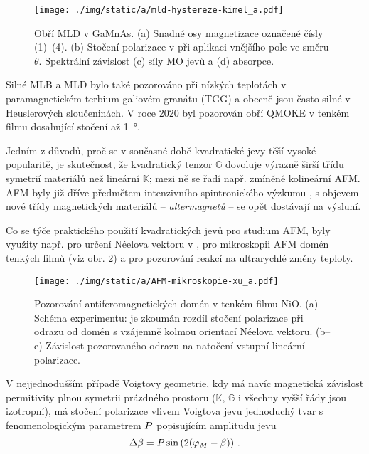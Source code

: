 \begin{figure}[htbp]
    \centering
    \texttt{[image: ./img/static/a/mld-hystereze-kimel\_a.pdf]}
    \caption{Obří MLD v GaMnAs. (a) Snadné osy magnetizace označené čísly (1)--(4). (b) Stočení polarizace v při aplikaci vnějšího pole ve směru $\theta$. Spektrální závislost (c) síly MO jevů a (d) absorpce. \cite{kimelObservationGiantMagnetic2005}}
    \label{fig:obri-MLD}
\end{figure}

Silné MLB a MLD bylo také pozorováno při nízkých teplotách v paramagnetickém terbium-galiovém granátu (TGG)\cite{akbarLowTemperatureVoigt2017} a obecně jsou často silné v Heuslerových sloučeninách\cite{hamrleHugeQuadraticMagnetooptical2007}.
V roce 2020 byl pozorován obří QMOKE v tenkém filmu  dosahující stočení až \SI{1}{\degree}\cite{katsGiantQuadraticMagnetooptical2020}.

Jedním z důvodů, proč se v současné době kvadratické jevy těší vysoké popularitě, je skutečnost, že kvadratický tenzor $\mathbb{G}$ dovoluje výrazně širší třídu symetrií materiálů než lineární $\mathbb{K}$; mezi ně se řadí např. zmíněné kolineární AFM. 
AFM byly již dříve předmětem intenzivního spintronického výzkumu \cite{nemecAntiferromagneticOptospintronics2018,jungwirthAntiferromagneticSpintronics2016}, 
s objevem nové třídy magnetických materiálů -- \emph{altermagnetů}\cite{smejkalAltermagnetismSpinmomentumLocked2021} -- se opět dostávají na výsluní.

Co se týče praktického použití kvadratických jevů pro studium AFM, byly využity např. pro určení Néelova vektoru v \cite{saidlOpticalDeterminationNeel2017}, pro mikroskopii AFM domén\cite{xuImagingAntiferromagneticDomains2019} tenkých filmů  (viz obr. \ref{fig:AFM-mikroskopie-domen}) a pro pozorování reakcí  na ultrarychlé změny teploty\cite{yangMagnetoopticResponseMetallic2019}.

\begin{figure}[htbp]
    \centering
    \texttt{[image: ./img/static/a/AFM-mikroskopie-xu\_a.pdf]}
    \caption{Pozorování antiferomagnetických domén v tenkém filmu NiO. (a) Schéma experimentu: je zkoumán rozdíl stočení polarizace při odrazu od domén s vzájemně kolmou orientací Néelova vektoru. (b--e) Závislost pozorovaného odrazu na natočení vstupní lineární polarizace. \cite{xuImagingAntiferromagneticDomains2019}}
    \label{fig:AFM-mikroskopie-domen}
\end{figure}

V nejjednodušším případě Voigtovy geometrie, kdy má navíc magnetická závislost permitivity plnou symetrii prázdného prostoru ($\mathbb{K}$, $\mathbb{G}$ i všechny vyšší řády jsou izotropní), má stočení polarizace vlivem Voigtova jevu jednoduchý tvar s fenomenologickým parametrem $P$ popisujícím amplitudu jevu\cite{tesarovaHighPrecisionMagnetic2012}
\begin{equation} 
\label{eqn:PMLD}
    \Delta \beta=P \sin\left(2(\varphi_M-\beta)\right) \,.
\end{equation}

